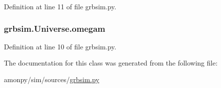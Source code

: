 Definition at line 11 of file grbsim.\-py.

\hypertarget{classgrbsim_1_1_universe_a50a43043c5dd268cba4242c241b730b4}{
\subsubsection[{omegam}]{\setlength{\rightskip}{0pt plus 5cm}grbsim.\-Universe.\-omegam}}\label{classgrbsim_1_1_universe_a50a43043c5dd268cba4242c241b730b4}


Definition at line 10 of file grbsim.\-py.



The documentation for this class was generated from the following file\-:\begin{DoxyCompactItemize}
\item 
amonpy/sim/sources/\hyperlink{grbsim_8py}{grbsim.\-py}\end{DoxyCompactItemize}
